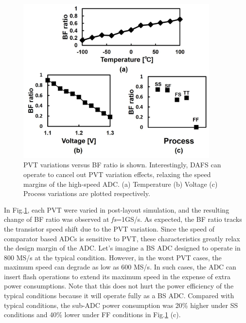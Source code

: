 \begin{figure}
\centering
  \includegraphics[width=0.9\textwidth]{figure/chap3/fig23.jpg}
  \caption{PVT variations versus BF ratio is shown. Interestingly, DAFS can operate to cancel out PVT variation effects, relaxing the speed margins of the high-speed ADC. (a) Temperature (b) Voltage (c) Process variations are plotted respectively.}
  \label{fig-3-21}
\end{figure}

In Fig.\ref{fig-3-21}, each PVT were varied in post-layout simulation, and the resulting change of BF ratio was observed at \textit{fs}=1GS/s. As expected, the BF ratio tracks the transistor speed shift due to the PVT variation. 
Since the speed of comparator based ADCs is sensitive to PVT, these characteristics greatly relax the design margin of the ADC.
Let's imagine a BS ADC designed to operate in 800 MS/s at the typical condition.
However, in the worst PVT cases, the maximum speed can degrade as low as 600 MS/s.
In such cases, the ADC can insert flash operations to extend its maximum speed in the expense of extra power consumptions. Note that this does not hurt the power efficiency of the typical conditions because it will operate fully as a BS ADC.
Compared with typical conditions, the sub-ADC power consumption was 20\% higher under SS conditions and 40\% lower under FF conditions in Fig.\ref{fig-3-21} (c).


